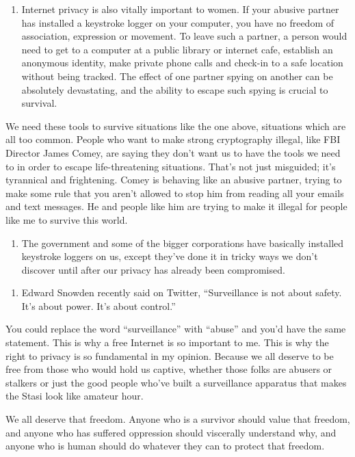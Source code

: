 \begin{enumerate}
\def\labelenumi{\arabic{enumi}.}
\setcounter{enumi}{17}
\tightlist
\item
  Internet privacy is also vitally important to women. If your abusive
  partner has installed a keystroke logger on your computer, you have no
  freedom of association, expression or movement. To leave such a
  partner, a person would need to get to a computer at a public library
  or internet cafe, establish an anonymous identity, make private phone
  calls and check-in to a safe location without being tracked. The
  effect of one partner spying on another can be absolutely devastating,
  and the ability to escape such spying is crucial to survival.
\end{enumerate}

We need these tools to survive situations like the one above, situations
which are all too common. People who want to make strong cryptography
illegal, like FBI Director James Comey, are saying they don't want us to
have the tools we need to in order to escape life-threatening
situations. That's not just misguided; it's tyrannical and frightening.
Comey is behaving like an abusive partner, trying to make some rule that
you aren't allowed to stop him from reading all your emails and text
messages. He and people like him are trying to make it illegal for
people like me to survive this world.

\begin{enumerate}
\def\labelenumi{\arabic{enumi}.}
\setcounter{enumi}{18}
\tightlist
\item
  The government and some of the bigger corporations have basically
  installed keystroke loggers on us, except they've done it in tricky
  ways we don't discover until after our privacy has already been
  compromised.
\end{enumerate}

\begin{enumerate}
\def\labelenumi{\arabic{enumi}.}
\setcounter{enumi}{19}
\tightlist
\item
  Edward Snowden recently said on Twitter, ``Surveillance is not about
  safety. It's about power. It's about control.''
\end{enumerate}

You could replace the word ``surveillance'' with ``abuse'' and you'd
have the same statement. This is why a free Internet is so important to
me. This is why the right to privacy is so fundamental in my opinion.
Because we all deserve to be free from those who would hold us captive,
whether those folks are abusers or stalkers or just the good people
who've built a surveillance apparatus that makes the Stasi look like
amateur hour.

We all deserve that freedom. Anyone who is a survivor should value that
freedom, and anyone who has suffered oppression should viscerally
understand why, and anyone who is human should do whatever they can to
protect that freedom.
